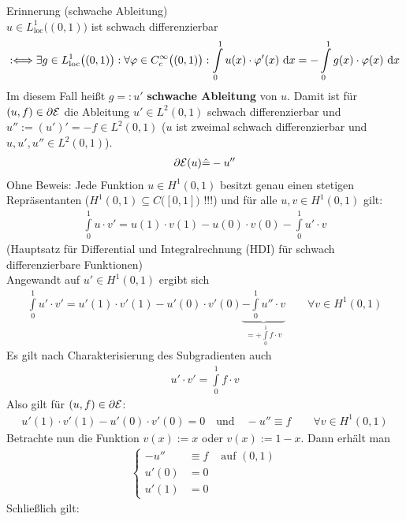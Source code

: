\begin{beispiel}
	Erinnerung (schwache Ableitung)\\
	$u\in L^1_{\text{loc}}\big((0,1)\big)$ ist schwach differenzierbar
	\begin{align*}
		:\Longleftrightarrow\exists g\in L^1_{\text{loc}}\big((0,1)\big):\forall\varphi\in C_c^\infty\big((0,1)\big):
		\int\limits_0^1 u(x)\cdot\varphi'(x)\text{ d} x=-\int\limits_0^1 g(x)\cdot\varphi(x)\text{ d} x
	\end{align*}
	Im diesem Fall heißt $g=:u'$ \textbf{schwache Ableitung} von $u$. 
	Damit ist für $(u,f)\in\partial\mathcal{E}$ die Ableitung $u'\in L^2(0,1)$ schwach differenzierbar und $u'':=(u')'=-f\in L^2(0,1)$ 
	($u$ ist zweimal schwach differenzierbar und $u,u',u''\in L^2(0,1)$).
	\begin{align*}
		\partial\mathcal{E}(u)\hat{=}-u''
	\end{align*}
	Ohne Beweis: Jede Funktion $u\in H^1(0,1)$ besitzt genau einen stetigen Repräsentanten ($H^1(0,1)\subseteq C\big([0,1]\big)$ !!!) und für alle $u,v\in H^1(0,1)$ gilt:
	\begin{align*}
		\int\limits_0^1 u\cdot v'=u(1)\cdot v(1)-u(0)\cdot v(0)-\int\limits_0^1 u'\cdot v
	\end{align*} 
	(Hauptsatz für Differential und Integralrechnung (HDI) für schwach differenzierbare Funktionen)\\
	Angewandt auf $u'\in H^1(0,1)$ ergibt sich 
	\begin{align*}
		\int\limits_0^1 u'\cdot v'=u'(1)\cdot v'(1)-u'(0)\cdot v'(0)\underbrace{-\int\limits_0^1 u''\cdot v}_{=+\int\limits_0^1 f\cdot v}\qquad\forall v\in H^1(0,1)
	\end{align*}
	Es gilt nach Charakterisierung des Subgradienten auch 
	\begin{align*}
		u'\cdot v'=\int\limits_0^1 f\cdot v
	\end{align*}
	Also gilt für $(u,f)\in \partial\mathcal{E}$:
	\begin{align*}
		u'(1)\cdot v'(1)-u'(0)\cdot v'(0)=0\quad\text{und}\quad -u''\equiv f
		\qquad\forall v\in H^1(0,1)
	\end{align*}
	Betrachte nun die Funktion $v(x):=x$ oder $v(x):=1-x$. 
	Dann erhält man 
	\begin{align*}
		\left\lbrace\begin{array}{rll}
			-u'' &\equiv f &\text{ auf }(0,1)\\
			u'(0)&=0\\
			u'(1)&=0
		\end{array}\right.
	\end{align*}
	Schließlich gilt:

\end{beispiel}
